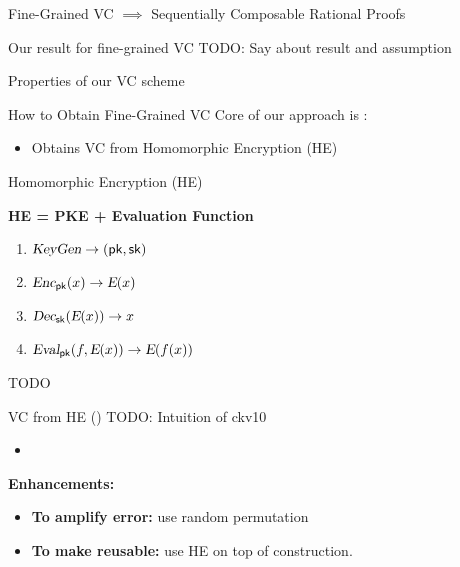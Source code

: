 \begin{frame}{Fine-Grained VC $\implies$ Sequentially Composable Rational Proofs}
\end{frame}

\begin{frame}{Our result for fine-grained VC}
	TODO: Say about result and assumption
\end{frame}

\begin{frame}{Properties of our VC scheme}
\end{frame}

\begin{frame}{How to Obtain Fine-Grained VC}
	Core of our approach is \cite{ckv10}:
	\begin{itemize}
		\item  Obtains VC from Homomorphic Encryption (HE)
	\end{itemize}
\end{frame}

\def\E{\func{E}}

\begin{frame}{Homomorphic Encryption (HE)}
	\begin{center} \textbf{HE = PKE + Evaluation Function} \end{center}
	\begin{enumerate}
		\item ${\textsl{KeyGen}} \to (\mathsf{pk}, \mathsf{sk})$
		\item $\func{Enc}_{\pk}(x) \to \E(x)$
		\item $\func{Dec}_{\sk}(\E(x)) \to x$
		\pause  
		\item $\func{Eval}_{\pk}(f, \E(x)) \to \E(f(x))$
	\end{enumerate}
	\pause
	
	\begin{result}
		TODO
	\end{result}
\end{frame}

\begin{frame}{VC from HE (\cite{ckv10})}
	TODO: Intuition of ckv10
	\begin{itemize}
		\item 
	\end{itemize}
	\pause
	\textbf{Enhancements:}
	\begin{itemize}
		\item \textbf{To amplify error:} use random permutation
		\item \textbf{To make reusable:} use HE  on top of construction.
	\end{itemize}
\end{frame}

